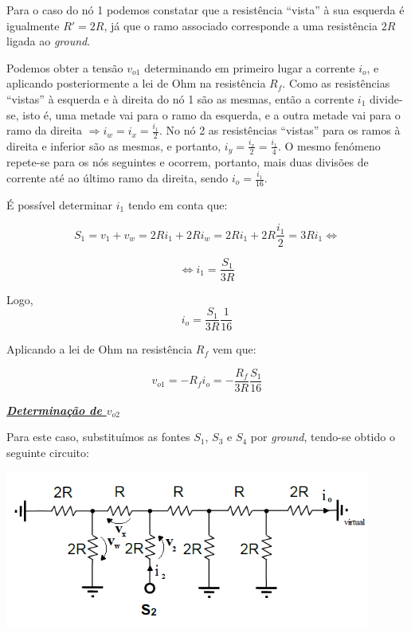 \documentclass[a4paper,11pt]{report}
\begin{document}
Para o caso do nó 1 podemos constatar que a resistência ``vista'' à sua esquerda é igualmente $R'=2R$, já que o ramo associado corresponde a uma resistência $2R$ ligada ao \textit{ground}.


Podemos obter a tensão $v_{o1}$ determinando em primeiro lugar a corrente $i_o$, e aplicando posteriormente a lei de Ohm na resistência $R_f$. Como as resistências ``vistas'' à esquerda e à direita do nó 1 são as mesmas, então a corrente $i_1$ divide-se, isto é, uma metade vai para o ramo da esquerda, e a outra metade vai para o ramo da direita $\Rightarrow i_w=i_x=\frac{i_1}{2}$. No nó 2 as resistências ``vistas'' para os ramos à direita  e inferior são as mesmas, e portanto, $i_y=\frac{i_x}{2}=\frac{i_1}{4}$. O mesmo fenómeno repete-se para os nós seguintes e ocorrem, portanto, mais duas divisões de corrente até ao último ramo da direita, sendo $i_o=\frac{i_1}{16}$.

É possível determinar $i_1$ tendo em conta que:

$$S_1=v_1+v_w=2Ri_1+2Ri_w=2Ri_1+2R\frac{i_1}{2}=3Ri_1\Leftrightarrow$$

$$\Leftrightarrow i_1=\frac{S_1}{3R}$$

Logo,
$$i_o=\frac{S_1}{3R}\frac{1}{16}$$

Aplicando a lei de Ohm na resistência $R_f$ vem que:

\begin{equation}\label{eq:v01}
v_{o1}=-R_fi_o=-\frac{R_f}{3R}\frac{S_1}{16}
\end{equation}

\large\underline{{\textit{\textbf{Determinação de $v_{o2}$}}}}\\
\par

Para este caso,  substituímos as fontes $S_1$, $S_3$ e $S_4$ por \textit{ground}, tendo-se obtido o seguinte circuito:


\begin{center}
     \includegraphics[angle=0,width=0.9\textwidth]{v02.png}
     \label{fig:v02}
     \end{center}
     
\end{document}
